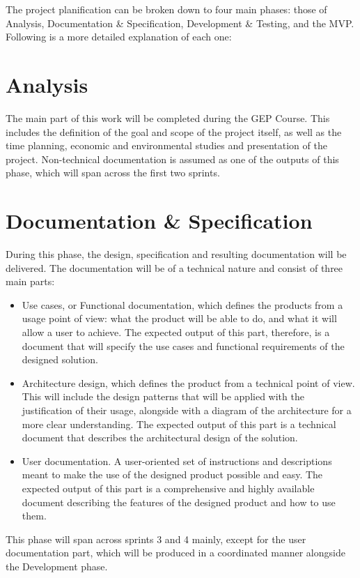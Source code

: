 The project planification can be broken down to four main phases: those of Analysis, Documentation \& Specification, Development \& Testing, and the MVP. Following is a more detailed explanation of each one:

\section{Analysis}
The main part of this work will be completed during the GEP Course. This includes the definition of the goal and scope of the project itself, as well as the time planning, economic and environmental studies and presentation of the project. Non-technical documentation is assumed as one of the outputs of this phase, which will span across the first two sprints.

\section{Documentation \& Specification}
During this phase, the design, specification and resulting documentation will be delivered. The documentation will be of a technical nature and consist of three main parts:

\begin{itemize}
\item Use cases, or Functional documentation, which defines the products from a usage point of view: what the product will be able to do, and what it will allow a user to achieve. The expected output of this part, therefore, is a document that will specify the use cases and functional requirements of the designed solution.

\item Architecture design, which defines the product from a technical point of view. This will include the design patterns that will be applied with the justification of their usage, alongside with a diagram of the architecture for a more clear understanding. The expected output of this part is a technical document that describes the architectural design of the solution.

\item User documentation. A user-oriented set of instructions and descriptions meant to make the use of the designed product possible and easy. The expected output of this part is a comprehensive and highly available document describing the features of the designed product and how to use them.
\end{itemize}

This phase will span across sprints 3 and 4 mainly, except for the user documentation part, which will be produced in a coordinated manner alongside the Development phase.

